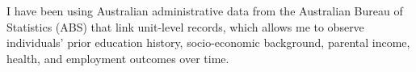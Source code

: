 \documentclass[11pt]{article}
\begin{document}
\\~\\
I have been using Australian administrative data from the Australian Bureau of Statistics (ABS) that link unit-level records, which allows me to observe individuals' prior education history, socio-economic background, parental income, health, and employment outcomes over time.
\end{document}
